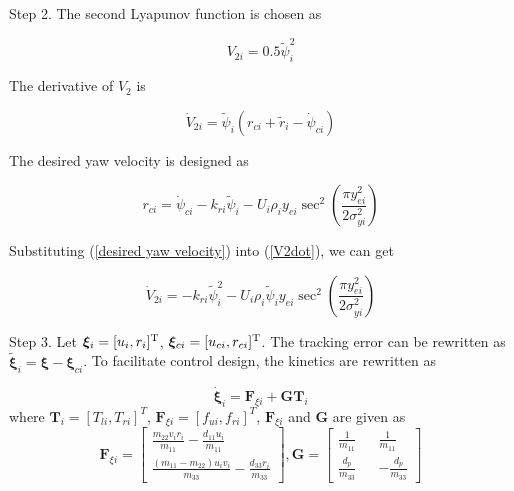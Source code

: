 \documentclass[english]{cccconf}
\begin{document}
Step 2. The second Lyapunov function is chosen as

\begin{equation} \label{V2}
	V_{2i}=0.5\tilde{\psi}^2_i
\end{equation}

The derivative of $V_2$ is 

\begin{equation} \label{V2dot}
	\dot{V}_{2i}=\tilde{\psi}_i(r_{ci}+\tilde{r}_i-\dot{\psi}_{ci})
\end{equation}

The desired yaw velocity is designed as

\begin{equation} \label{desired yaw velocity}
	r_{ci}=\dot{\psi}_{ci}-k_{ri}\tilde{\psi}_i-U_i\rho_iy_{ei}\sec^2(\frac{\pi y^2_{ei}}{2\sigma^2_{yi}})
\end{equation}

Substituting (\ref{desired yaw velocity}) into (\ref{V2dot}), we can get

\begin{equation} \label{V2dot}
	\dot{V}_{2i}=-k_{ri}\tilde{\psi}^2_i-U_i\rho_i\tilde{\psi}_iy_{ei}\sec^2(\frac{\pi y^2_{ei}}{2\sigma^2_{yi}})
\end{equation}

Step 3. Let $\bm{\xi}_i=[u_i,r_i]^{\rm T}$, $\bm{\xi}_{ci}=[u_{ci},r_{ci}]^{\rm T}$. The tracking error can be rewritten as $\tilde{\bm{\xi}}_i=\bm{\xi}-\bm{\xi}_{ci}$. To facilitate control design, the kinetics are rewritten as

\begin{equation} \label{kinetics 2}
	\dot{\bm{\xi}}_i=\bm{F}_{\xi i}+\bm{G}\bm{T}_i
\end{equation}
where $\bm{T}_i=\left[T_{li},T_{ri}\right]^T$, $\bm{F}_{\xi i}=\left[f_{ui},f_{ri}\right]^T$, $\bm{F}_{\xi i}$ and $\bm{G}$ are given as\\
\begin{equation*}
\bm{F}_{\xi i}=
\begin{bmatrix}
	\frac{m_{22}v_ir_i}{m_{11}}-\frac{d_{11}u_i}{m_{11}}\\
	\frac{(m_{11}-m_{22})u_iv_i}{m_{33}}-\frac{d_{33}r_i}{m_{33}}
\end{bmatrix},
\bm{G}=
\begin{bmatrix}
	\frac{1}{m_{11}} && \frac{1}{m_{11}}\\
	\frac{d_p}{m_{33}} && -\frac{d_p}{m_{33}}
\end{bmatrix}
\end{equation*}
\end{document}

